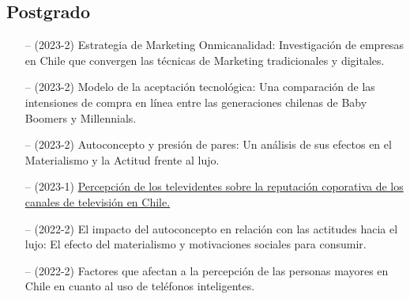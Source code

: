 \documentclass[11pt,a4paper,]{awesome-cv}
\begin{document}
\subsection{Postgrado}\label{postgrado}

\begin{cventries}
\end{cventries}

\vspace{-0.3cm} \begingroup \footnotesize

\begin{itemize}
    \item[--] (2023-2) Estrategia de Marketing Onmicanalidad: Investigación de empresas en Chile que convergen las técnicas de Marketing tradicionales y digitales.
    \item[--] (2023-2) Modelo de la aceptación tecnológica: Una comparación de las intensiones de compra en línea entre las generaciones chilenas de Baby Boomers y Millennials.
    \item[--] (2023-2) Autoconcepto y presión de pares: Un análisis de sus efectos en el Materialismo y la Actitud frente al lujo.
    \item[--] (2023-1) \href{https://repositoriobiblioteca.udp.cl/TD002861.pdf#pagemode=thumbs}{Percepción de los televidentes sobre la reputación coporativa de los canales de televisión en Chile.}
    \item[--] (2022-2) El impacto del autoconcepto en relación con las actitudes hacia el lujo: El efecto del materialismo y motivaciones sociales para consumir.
    \item[--] (2022-2) Factores que afectan a la percepción de las personas mayores en Chile en cuanto al uso de teléfonos inteligentes.
  \end{itemize}
  \endgroup
  \vspace{-0.7cm}

\begin{cventries}
\end{cventries}
\end{document}
